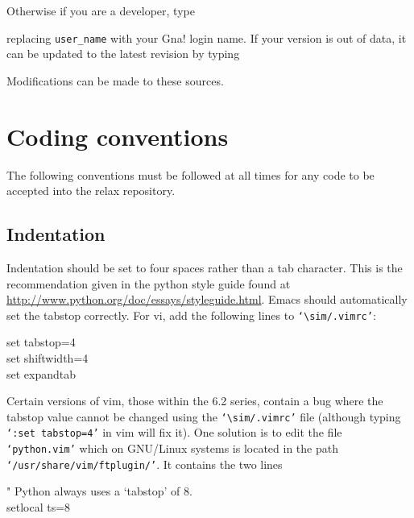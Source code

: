 
Otherwise if you are a developer, type


replacing \texttt{user\_name} with your Gna! login name.  If your version is out of data, it can be updated to the latest revision by typing


Modifications can be made to these sources.




\section{Coding conventions}

The following conventions must be followed at all times for any code to be accepted into the relax repository.



\subsection{Indentation}

Indentation should be set to four spaces rather than a tab character.  This is the recommendation given in the python style guide found at \href{http://www.python.org/doc/essays/styleguide.html}{http://www.python.org/doc/essays/styleguide.html}.  Emacs should automatically set the tabstop correctly.  For vi, add the following lines to \texttt{`$\sim$/.vimrc'}:

\begin{exampleenv}
set tabstop=4 \\
set shiftwidth=4 \\
set expandtab
\end{exampleenv}

Certain versions of vim, those within the 6.2 series, contain a bug where the tabstop value cannot be changed using the \texttt{`$\sim$/.vimrc'} file (although typing \texttt{`:set tabstop=4'} in vim will fix it).  One solution is to edit the file \texttt{`python.vim'} which on GNU/Linux systems is located in the path \texttt{`/usr/share/vim/ftplugin/'}.  It contains the two lines

\begin{exampleenv}
" Python always uses a `tabstop' of 8. \\
setlocal ts=8
\end{exampleenv}

